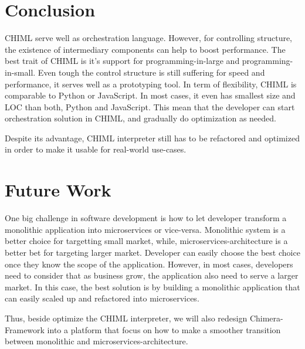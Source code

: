 \documentclass[conference]{IEEEtran}
\begin{document}
\section{Conclusion}

CHIML serve well as orchestration language. However, for controlling structure, the existence of intermediary components can help to boost performance. The best trait of CHIML is it's support for programming-in-large and programming-in-small. Even tough the control structure is still suffering for speed and performance, it serves well as a prototyping tool. In term of flexibility, CHIML is comparable to Python or JavaScript. In most cases, it even has smallest size and LOC than both, Python and JavaScript. This mean that the developer can start orchestration solution in CHIML, and gradually do optimization as needed.

Despite its advantage, CHIML interpreter still has to be refactored and optimized in order to make it usable for real-world use-cases.

\section{Future Work}

One big challenge in software development is how to let developer transform a monolithic application into microservices or vice-versa. Monolithic system is a better choice for targetting small market, while, microservices-architecture is a better bet for targeting larger market. Developer can easily choose the best choice once they know the scope of the application. However, in most cases, developers need to consider that as business grow, the application also need to serve a larger market. In this case, the best solution is by building a monolithic application that can easily scaled up and refactored into microservices.

Thus, beside optimize the CHIML interpreter, we will also redesign Chimera-Framework into a platform that focus on how to make a smoother transition between monolithic and microservices-architecture. 




\ifCLASSOPTIONcaptionsoff
  \newpage
\fi




\end{document}
